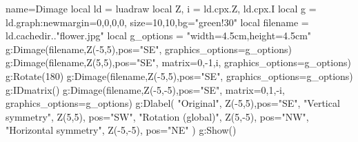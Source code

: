 \begin{luadraw}{name=Dimage}
local ld = luadraw
local Z, i = ld.cpx.Z, ld.cpx.I
local g = ld.graph:new{margin={0,0,0,0}, size={10,10},bg="green!30"}
local filename = ld.cachedir.."flower.jpg"
local g_options = "width=4.5cm,height=4.5cm"
g:Dimage(filename,Z(-5,5),{pos="SE", graphics_options=g_options})
g:Dimage(filename,Z(5,5),{pos="SE", matrix={0,-1,i}, graphics_options=g_options})
g:Rotate(180)
g:Dimage(filename,Z(-5,5),{pos="SE", graphics_options=g_options})
g:IDmatrix()
g:Dimage(filename,Z(-5,-5),{pos="SE", matrix={0,1,-i}, graphics_options=g_options})
g:Dlabel( "Original", Z(-5,5),{pos="SE"},
"Vertical symmetry", Z(5,5), {pos="SW"},
"Rotation (global)", Z(5,-5), {pos="NW"},
"Horizontal symmetry", Z(-5,-5), {pos="NE"} )
g:Show()
\end{luadraw}
